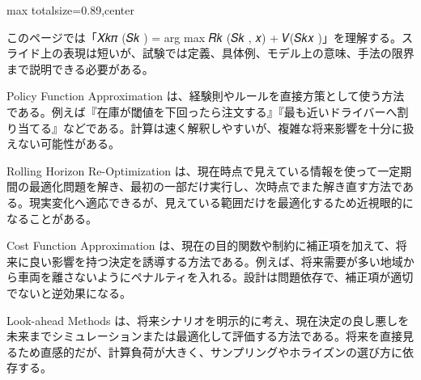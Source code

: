 \begin{minipage}[t]{0.58\textwidth}
\begin{adjustbox}{max totalsize={\textwidth}{0.89\textheight},center}
\begin{minipage}{\textwidth}\scriptsize
{}このページでは「𝑋𝑘𝜋 (𝑆𝑘 ) = arg max 𝑅𝑘 (𝑆𝑘 , 𝑥) + 𝑉(𝑆𝑘𝑥 )」を理解する。スライド上の表現は短いが、試験では定義、具体例、モデル上の意味、手法の限界まで説明できる必要がある。\par
Policy Function Approximation は、経験則やルールを直接方策として使う方法である。例えば『在庫が閾値を下回ったら注文する』『最も近いドライバーへ割り当てる』などである。計算は速く解釈しやすいが、複雑な将来影響を十分に扱えない可能性がある。\par
Rolling Horizon Re-Optimization は、現在時点で見えている情報を使って一定期間の最適化問題を解き、最初の一部だけ実行し、次時点でまた解き直す方法である。現実変化へ適応できるが、見えている範囲だけを最適化するため近視眼的になることがある。\par
Cost Function Approximation は、現在の目的関数や制約に補正項を加えて、将来に良い影響を持つ決定を誘導する方法である。例えば、将来需要が多い地域から車両を離さないようにペナルティを入れる。設計は問題依存で、補正項が適切でないと逆効果になる。\par
Look-ahead Methods は、将来シナリオを明示的に考え、現在決定の良し悪しを未来までシミュレーションまたは最適化して評価する方法である。将来を直接見るため直感的だが、計算負荷が大きく、サンプリングやホライズンの選び方に依存する。\par

\end{minipage}
\end{adjustbox}
\end{minipage}
